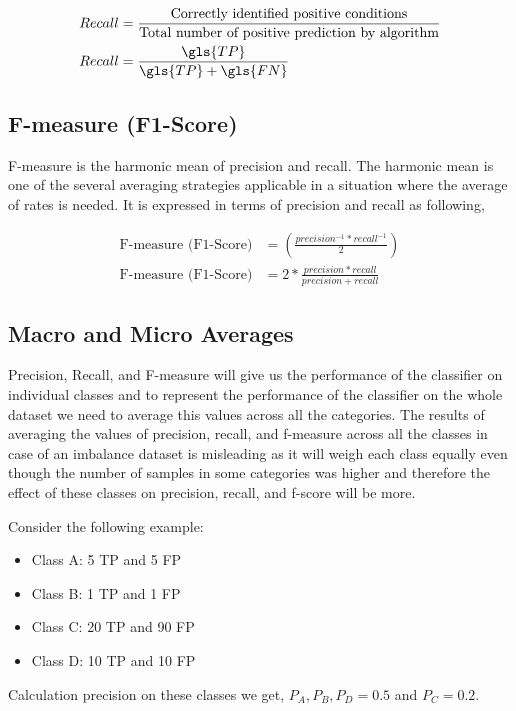 \begin{align}
    Recall &= \frac{\text{Correctly identified positive conditions}}{\text{Total number of positive prediction by algorithm}}\\
    Recall &= \frac{\gls{TP}}{\gls{TP}+\gls{FN}}
\end{align}

\subsection*{F-measure (F1-Score)}
F-measure is the harmonic mean of precision and recall. The harmonic mean is one of the several averaging strategies applicable in a situation where the average of rates is needed. It is expressed in terms of precision and recall as following,

\begin{align}
    \text{F-measure (F1-Score)} &= \left (\frac{precision^{-1} * recall^{-1}}{2}  \right ) \\
    \text{F-measure (F1-Score)} &= 2 * \frac{precision * recall}{precision + recall}
\end{align}

\subsection*{Macro and Micro Averages}

Precision, Recall, and F-measure will give us the performance of the classifier on individual classes and to represent the performance of the classifier on the whole dataset we need to average this values across all the categories. The results of averaging the values of precision, recall, and f-measure across all the classes in case of an imbalance dataset is misleading as it will weigh each class equally even though the number of samples in some categories was higher and therefore the effect of these classes on precision, recall, and f-score will be more. 

Consider the following example:
\begin{itemize}
    \item Class A: 5 \gls{TP} and 5 \gls{FP}
    \item Class B: 1 \gls{TP} and 1 \gls{FP}
    \item Class C: 20 \gls{TP} and 90 \gls{FP}
    \item Class D: 10 \gls{TP} and 10 \gls{FP}
\end{itemize}

Calculation precision on these classes we get, $P_{A}, P_{B}, P_{D}= 0.5$ and $P_{C} = 0.2$. 

